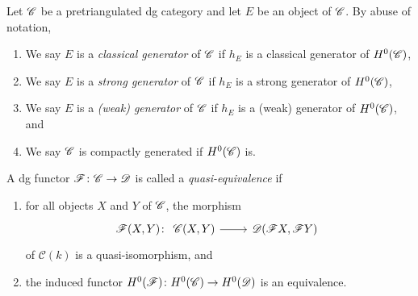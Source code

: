 \documentclass[dissertation.tex]{subfiles}
\begin{document}
\begin{defn}
  Let $\mathscr{C}$ be a pretriangulated dg category and let $E$ be an object of $\mathscr{C}$.
  By abuse of notation, 
  \begin{enumerate}
  \item
    We say $E$ is a {\it classical generator} of $\mathscr{C}$ if $h_E$ is a classical generator of $H^0(\mathscr{C})$,
  \item
    We say $E$ is a {\it strong generator} of $\mathscr{C}$ if $h_E$ is a strong generator of $H^0(\mathscr{C})$,
  \item
    We say $E$ is a {\it (weak) generator} of $\mathscr{C}$ if $h_E$ is a (weak) generator of $H^0(\mathscr{C})$, and
  \item
    We say $\mathscr{C}$ is compactly generated if $H^0(\mathscr{C})$ is.
  \end{enumerate}
\end{defn}


\begin{defn}
  A dg functor $\mathscr{F} \colon \mathscr{C} \rightarrow \mathscr{D}$ is called a {\it quasi-equivalence} if 
  \begin{enumerate}
  \item
    for all objects $X$ and $Y$ of $\mathscr{C}$, the morphism
    $$\mathscr{F}(X,Y) \colon
    \begin{tikzcd}
      \CC(X,Y) \arrow{r} & \D(\mathscr{F}X,\mathscr{F}Y)
    \end{tikzcd}$$
    of $\mathcal{C}(k)$ is a quasi-isomorphism, and
  \item
    the induced functor $H^0(\mathscr{F}) \colon H^0(\mathscr{C}) \rightarrow H^0(\mathscr{D})$ is an equivalence.
  \end{enumerate}
\end{defn}
\end{document}

